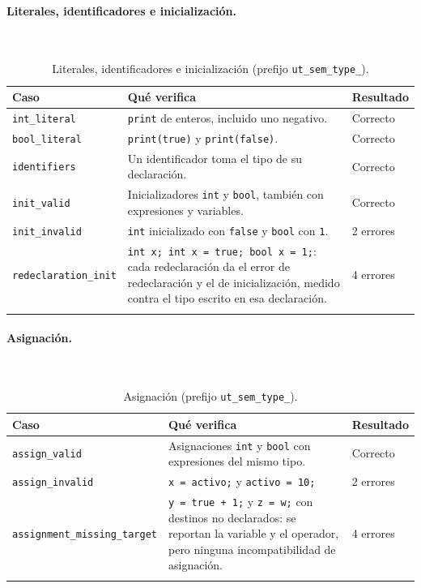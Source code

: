 \documentclass[12pt,letterpaper]{article}
\begin{document}
\paragraph{Literales, identificadores e inicialización.}\mbox{}\\[0.3em]
\begin{longtable}{|p{5.2cm}|p{7.6cm}|p{3.4cm}|}
\hline
\textbf{Caso} & \textbf{Qué verifica} & \textbf{Resultado} \\ \hline \endhead
\footnotesize\texttt{int\_literal} & \small \texttt{print} de enteros, incluido uno negativo. & \small Correcto \\ \hline
\footnotesize\texttt{bool\_literal} & \small \texttt{print(true)} y \texttt{print(false)}. & \small Correcto \\ \hline
\footnotesize\texttt{identifiers} & \small Un identificador toma el tipo de su declaración. & \small Correcto \\ \hline
\footnotesize\texttt{init\_valid} & \small Inicializadores \texttt{int} y \texttt{bool}, también con expresiones y variables. & \small Correcto \\ \hline
\footnotesize\texttt{init\_invalid} & \small \texttt{int} inicializado con \texttt{false} y \texttt{bool} con \texttt{1}. & \small 2 errores \\ \hline
\footnotesize\texttt{redeclaration\_init} & \small \texttt{int x; int x = true; bool x = 1;}: cada redeclaración da el error de redeclaración y el de inicialización, medido contra el tipo escrito en esa declaración. & \small 4 errores \\ \hline
\caption{Literales, identificadores e inicialización (prefijo \texttt{ut\_sem\_type\_}).}
\end{longtable}
\paragraph{Asignación.}\mbox{}\\[0.3em]
\begin{longtable}{|p{5.2cm}|p{7.6cm}|p{3.4cm}|}
\hline
\textbf{Caso} & \textbf{Qué verifica} & \textbf{Resultado} \\ \hline \endhead
\footnotesize\texttt{assign\_valid} & \small Asignaciones \texttt{int} y \texttt{bool} con expresiones del mismo tipo. & \small Correcto \\ \hline
\footnotesize\texttt{assign\_invalid} & \small \texttt{x = activo;} y \texttt{activo = 10;} & \small 2 errores \\ \hline
\footnotesize\texttt{assignment\_missing\_target} & \small \texttt{y = true + 1;} y \texttt{z = w;} con destinos no declarados: se reportan la variable y el operador, pero ninguna incompatibilidad de asignación. & \small 4 errores \\ \hline
\caption{Asignación (prefijo \texttt{ut\_sem\_type\_}).}
\end{longtable}
\end{document}
